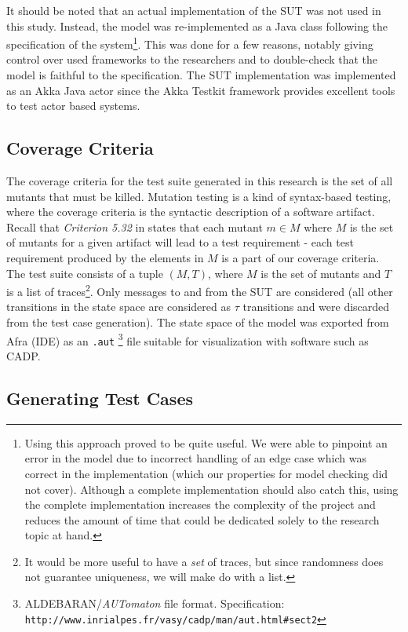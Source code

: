 \documentclass{article}
\begin{document}
			It should be noted that an actual implementation of the SUT was not used in this study. Instead, the model was re-implemented as a Java class following the specification of the system\footnote{Using this approach proved to be quite useful. We were able to pinpoint an error in the model due to incorrect handling of an edge case which was correct in the implementation (which our properties for model checking did not cover). Although a complete implementation should also catch this, using the complete implementation increases the complexity of the project and reduces the amount of time that could be dedicated solely to the research topic at hand. }. This was done for a few reasons, notably giving control over used frameworks to the researchers and to double-check that the model is faithful to the specification. The SUT implementation was implemented as an Akka Java actor since the Akka Testkit framework provides excellent tools to test actor based systems.

		\subsection{Coverage Criteria}
			\label{sec:coveragecrit}
			The coverage criteria for the test suite generated in this research is the set of all mutants that must be killed. Mutation testing is a kind of syntax-based testing, where the coverage criteria is the syntactic description of a software artifact. Recall that \textit{Criterion 5.32} in \citet{ammann2008introduction} states that each mutant $m \in M$ where $M$ is the set of mutants for a given artifact will lead to a test requirement \-- each test requirement produced by the elements in $M$ is a part of our coverage criteria.
			The test suite consists of a tuple $(M, T)$, where $M$ is the set of mutants and $T$ is a list of traces\footnote{It would be more useful to have a \textit{set} of traces, but since randomness does not guarantee uniqueness, we will make do with a list.}. Only messages to and from the SUT are considered (all other transitions in the state space are considered as $\tau$ transitions and were discarded from the test case generation). The state space of the model was exported from Afra (\Rebeca IDE) as an \texttt{.aut}
			\footnote{ALDEBARAN/\textit{AUTomaton} file format. Specification: \texttt{http://www.inrialpes.fr/vasy/cadp/man/aut.html\#sect2}} file suitable for visualization with software such as CADP.

		\subsection{Generating Test Cases}
			\label{sec:method_testgen}
\end{document}
